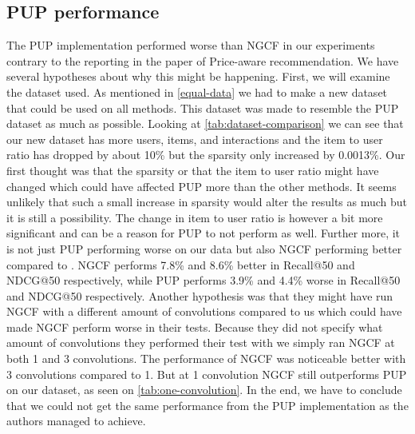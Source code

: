 \subsection{PUP performance}
The PUP implementation performed worse than NGCF in our experiments contrary to the reporting in the paper of Price-aware recommendation\cite{Priceaware}.
We have several hypotheses about why this might be happening.
First, we will examine the dataset used.
As mentioned in \autoref{equal-data} we had to make a new dataset that could be used on all methods.
This dataset was made to resemble the PUP dataset as much as possible.
Looking at \autoref{tab:dataset-comparison} we can see that our new dataset has more users, items, and interactions and the item to user ratio has dropped by about 10\% but the sparsity only increased by 0.0013\%.
Our first thought was that the sparsity or that the item to user ratio might have changed which could have affected PUP more than the other methods.
It seems unlikely that such a small increase in sparsity would alter the results as much but it is still a possibility.
The change in item to user ratio is however a bit more significant and can be a reason for PUP to not perform as well.
Further more, it is not just PUP performing worse on our data but also NGCF performing better compared to \cite{Priceaware}.
NGCF performs 7.8\% and 8.6\% better in Recall@50 and NDCG@50 respectively, while PUP performs 3.9\% and 4.4\% worse in Recall@50 and NDCG@50 respectively.
Another hypothesis was that they might have run NGCF with a different amount of convolutions compared to us which could have made NGCF perform worse in their tests.
Because they did not specify what amount of convolutions they performed their test with we simply ran NGCF at both 1 and 3 convolutions.
The performance of NGCF was noticeable better with 3 convolutions compared to 1.
But at 1 convolution NGCF still outperforms PUP on our dataset, as seen on \autoref{tab:one-convolution}.
In the end, we have to conclude that we could not get the same performance from the PUP implementation as the authors managed to achieve.
